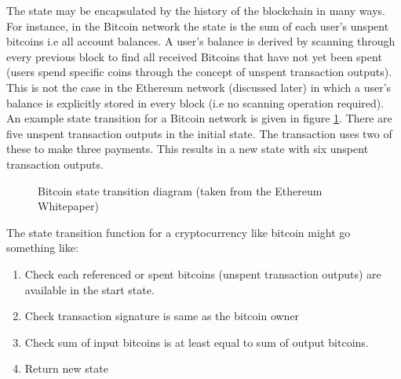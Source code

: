The state may be encapsulated by the history of the blockchain in many ways. For instance, in the Bitcoin network the state is the sum of each user's unspent bitcoins i.e all account balances. A user's balance is derived by scanning through every previous block to find all received Bitcoins that have not yet been spent (users spend specific coins through the concept of unspent transaction outputs). This is not the case in the Ethereum network (discussed later) in which a user's balance is explicitly stored in every block (i.e no scanning operation required). An example state transition for a Bitcoin network is given in figure \ref{fig:bitcoin_transition}. There are five unspent transaction outputs in the initial state. The transaction uses two of these to make three payments. This results in a new state with six unspent transaction outputs. \\

\begin{figure}
\centering
{}
\decoRule
\caption[Bitcoin State Transition]{Bitcoin state transition diagram (taken from the Ethereum Whitepaper\cite{Ethereum})}
\label{fig:bitcoin_transition}
\end{figure}

The state transition function for a cryptocurrency like bitcoin might go something like:
\begin{enumerate}
\item Check each referenced or spent bitcoins (unspent transaction outputs) are available in the start state.
\item Check transaction signature is same as the bitcoin owner
\item Check sum of input bitcoins is at least equal to sum of output bitcoins.
\item Return new state 
\end{enumerate}

